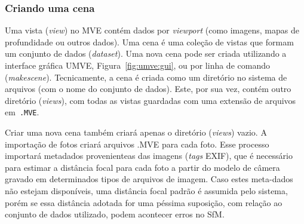 \subsubsection*{Criando uma cena}

Uma vista (\emph{view}) no MVE contém dados por \emph{viewport} (como imagens,
mapas de profundidade ou outros dados). Uma cena é uma coleção de vistas que
formam um conjunto de dados (\emph{dataset}). Uma nova cena pode ser criada
utilizando a interface gráfica UMVE, Figura~\ref{fig:umve:gui}, ou por linha de
comando (\emph{makescene}).  Tecnicamente, a cena é criada como um diretório no
sistema de arquivos (com o nome do conjunto de dados). Este, por sua vez, contém
outro diretório (\emph{views}), com todas as vistas guardadas com uma extensão
de arquivos em\ \texttt{.MVE}.

Criar uma nova cena também criará apenas o diretório (\emph{views}) vazio. A
importação de fotos criará arquivos .MVE para cada foto. Esse processo importará
metadados provenienteas das imagens (\emph{tags} EXIF), que é necessário para
estimar a distância focal para cada foto a partir do modelo de câmera gravado em
determinados tipos de arquivos de imagem. Caso estes meta-dados não estejam
disponíveis, uma distância focal padrão é assumida pelo sistema, porém se essa
distância adotada for uma péssima suposição, com relação ao conjunto de dados
utilizado, podem acontecer erros no SfM.

